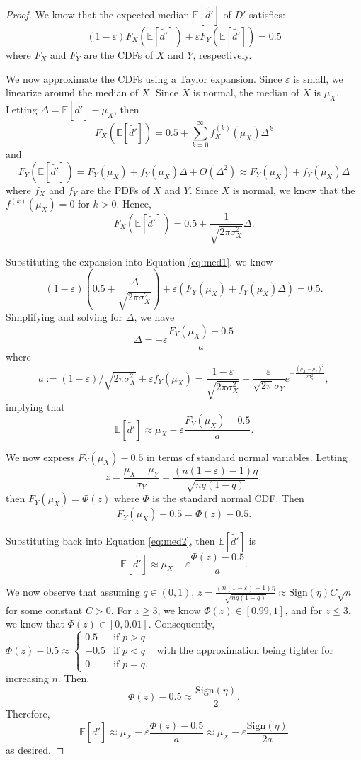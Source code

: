\documentclass[10pt,onecolumn,letterpaper]{article}
\newcommand{\ee}{\mathbb{E}}
\newcommand{\eps}{\varepsilon}
\let\epsilon\varepsilon
\begin{document}
\begin{proof}
We know that the expected median $\ee[\tilde{d'}]$ of $D'$ satisfies: \begin{equation}\label{eq:med1}
    (1 - \eps) F_X(\ee[\tilde{d'}]) + \eps F_Y(\ee[\tilde{d'}]) = 0.5
\end{equation} where $F_X$ and $F_Y$ are the CDFs of $X$ and $Y$, respectively.

We now approximate the CDFs using a Taylor expansion. Since $\eps$ is small, we linearize around the median of $X$. Since $X$ is normal, the median of $X$ is $\mu_X$. Letting $\Delta = \ee[\tilde{d'}] -\mu_X$, then $$F_X(\ee[\tilde{d'}]) = 0.5 + \sum_{k=0}^\infty f_X^{(k)}(\mu_X)\Delta^k$$ and 
$$F_Y(\ee[\tilde{d'}]) = F_Y(\mu_X) + f_Y(\mu_X)\Delta + O(\Delta^2) \approx  F_Y(\mu_X) + f_Y(\mu_X)\Delta$$ where $f_X$ and $f_Y$ are the PDFs of $X$ and $Y$. Since $X$ is normal, we know that the $f^{(k)}(\mu_X) = 0$ for $k > 0$. Hence, $$F_X(\ee[\tilde{d'}]) = 0.5 + \frac{1}{\sqrt{2\pi \sigma_X^2}}\Delta.$$

Substituting the expansion into Equation \ref{eq:med1}, we know $$(1-\eps)\left(0.5 + \frac{\Delta}{\sqrt{2\pi\sigma_X^2}}\right) + \eps\left(F_Y(\mu_X) + f_Y(\mu_X)\Delta\right) = 0.5.$$ Simplifying and solving for $\Delta$, we have $$\Delta = -\epsilon\frac{F_Y(\mu_X) - 0.5}{a}$$ where $$a := (1-\eps)/\sqrt{2\pi\sigma_X^2} + \eps f_Y(\mu_X) = \frac{1-\eps}{\sqrt{2\pi\sigma_X^2}} + \frac{\eps}{\sqrt{2\pi}\sigma_Y}e^{-\frac{(\mu_X-\mu_Y)^2}{2\sigma_Y^2}},$$ implying that \begin{equation}\label{eq:med2}
    \ee[\tilde{d'}] \approx \mu_X - \epsilon\frac{F_Y(\mu_X) - 0.5}{a}.
\end{equation}

We now express $F_Y(\mu_X) - 0.5$ in terms of standard normal variables. Letting $$z = \frac{\mu_X - \mu_Y}{\sigma_Y} = \frac{(n(1-\eps) - 1)\eta}{\sqrt{n q (1 - q)}},$$ then $F_Y(\mu_X) = \Phi(z)$ where $\Phi$ is the standard normal CDF. Then $$F_Y(\mu_X) - 0.5 = \Phi(z) -0.5.$$

Substituting back into Equation \ref{eq:med2}, then $\ee[\tilde{d'}]$ is $$\ee[\tilde{d'}] \approx \mu_X - \epsilon\frac{\Phi(z) - 0.5}{a}.$$ 

We now observe that assuming $q\in (0,1)$, $z = \frac{(n(1 - \eps) - 1)\eta}{\sqrt{nq(1-q)}} \approx \mathrm{Sign}(\eta)C\sqrt{n}$ for some constant $C> 0$. For $z \geq 3$, we know $\Phi(z) \in [0.99, 1]$, and for $z \leq 3$, we know that $\Phi(z) \in [0, 0.01]$. Consequently, $\Phi(z) - 0.5 \approx \begin{cases}
    0.5 &\text{if }p>q\\
    -0.5 &\text{if }p<q\\
    0 &\text{if }p=q,
\end{cases}$ with the approximation being tighter for increasing $n$. Then, $$\Phi(z) - 0.5 \approx \frac{\mathrm{Sign}(\eta)}{2}.$$ Therefore, $$\ee[\tilde{d'}]\approx \mu_X - \eps\frac{\Phi(z) - 0.5}{a} \approx \mu_X - \eps\frac{\mathrm{Sign}(\eta)}{2a}$$ as desired.
\end{proof}
\end{document}
